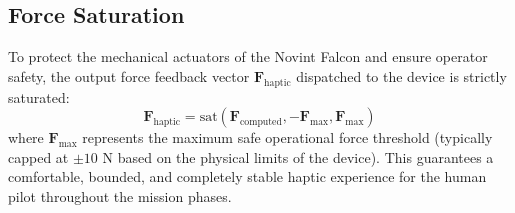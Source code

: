 \subsection{Force Saturation}
To protect the mechanical actuators of the Novint Falcon and ensure operator safety, the output force feedback vector $\mathbf{F}_{\text{haptic}}$ dispatched to the device is strictly saturated:
$$\mathbf{F}_{\text{haptic}} = \text{sat}\left(\mathbf{F}_{\text{computed}}, -\mathbf{F}_{\text{max}}, \mathbf{F}_{\text{max}}\right)$$
where $\mathbf{F}_{\text{max}}$ represents the maximum safe operational force threshold (typically capped at $\pm 10$ N based on the physical limits of the device). This guarantees a comfortable, bounded, and completely stable haptic experience for the human pilot throughout the mission phases.